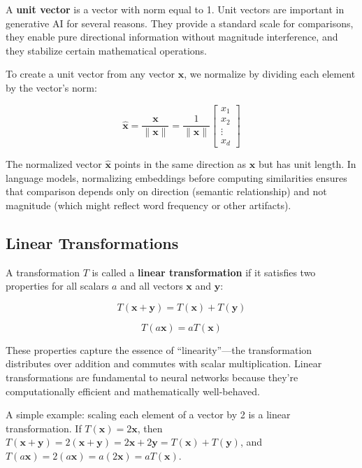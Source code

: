 \documentclass{book}
\begin{document}
A \textbf{unit vector} is a vector with norm equal to 1. Unit vectors are important in generative AI for several reasons. They provide a standard scale for comparisons, they enable pure directional information without magnitude interference, and they stabilize certain mathematical operations.

To create a unit vector from any vector $\mathbf{x}$, we normalize by dividing each element by the vector's norm:

\begin{equation}
\hat{\mathbf{x}} = \frac{\mathbf{x}}{\|\mathbf{x}\|} = \frac{1}{\|\mathbf{x}\|} \begin{bmatrix}
x_1 \\
x_2 \\
\vdots \\
x_d
\end{bmatrix}
\end{equation}

The normalized vector $\hat{\mathbf{x}}$ points in the same direction as $\mathbf{x}$ but has unit length. In language models, normalizing embeddings before computing similarities ensures that comparison depends only on direction (semantic relationship) and not magnitude (which might reflect word frequency or other artifacts).

\subsection{Linear Transformations}

A transformation $T$ is called a \textbf{linear transformation} if it satisfies two properties for all scalars $a$ and all vectors $\mathbf{x}$ and $\mathbf{y}$:

\begin{equation}
T(\mathbf{x} + \mathbf{y}) = T(\mathbf{x}) + T(\mathbf{y})
\end{equation}

\begin{equation}
T(a\mathbf{x}) = aT(\mathbf{x})
\end{equation}

These properties capture the essence of ``linearity''—the transformation distributes over addition and commutes with scalar multiplication. Linear transformations are fundamental to neural networks because they're computationally efficient and mathematically well-behaved.

A simple example: scaling each element of a vector by 2 is a linear transformation. If $T(\mathbf{x}) = 2\mathbf{x}$, then $T(\mathbf{x} + \mathbf{y}) = 2(\mathbf{x} + \mathbf{y}) = 2\mathbf{x} + 2\mathbf{y} = T(\mathbf{x}) + T(\mathbf{y})$, and $T(a\mathbf{x}) = 2(a\mathbf{x}) = a(2\mathbf{x}) = aT(\mathbf{x})$.
\end{document}
